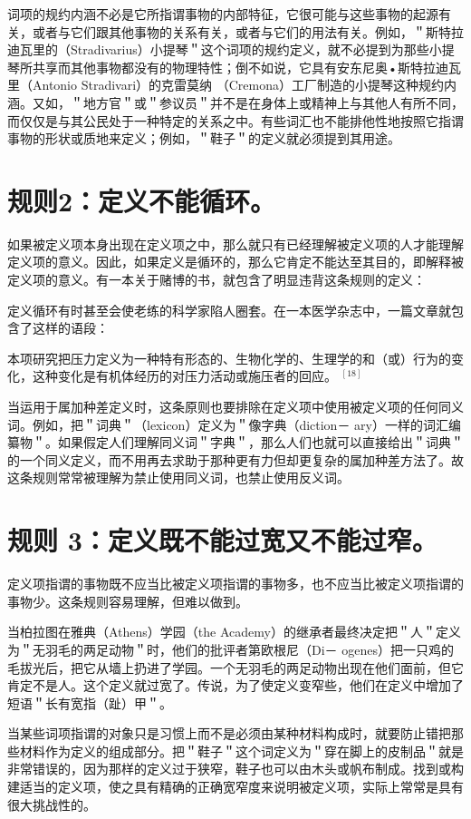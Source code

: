 词项的规约内涵不必是它所指谓事物的内部特征，它很可能与这些事物的起源有关，或者与它们跟其他事物的关系有关，或者与它们的用法有关。例如，＂斯特拉迪瓦里的（Stradivarius）小提琴＂这个词项的规约定义，就不必提到为那些小提琴所共享而其他事物都没有的物理特性；倒不如说，它具有安东尼奥•斯特拉迪瓦里（Antonio Stradivari）的克雷莫纳 （Cremona）工厂制造的小提琴这种规约内涵。又如，＂地方官＂或＂参议员＂并不是在身体上或精神上与其他人有所不同，而仅仅是与其公民处于一种特定的关系之中。有些词汇也不能排他性地按照它指谓事物的形状或质地来定义；例如，＂鞋子＂的定义就必须提到其用途。

\section*{规则2：定义不能循环。}
如果被定义项本身出现在定义项之中，那么就只有已经理解被定义项的人才能理解定义项的意义。因此，如果定义是循环的，那么它肯定不能达至其目的，即解释被定义项的意义。有一本关于赌博的书，就包含了明显违背这条规则的定义：

定义循环有时甚至会使老练的科学家陷人圈套。在一本医学杂志中，一篇文章就包含了这样的语段：

本项研究把压力定义为一种特有形态的、生物化学的、生理学的和（或）行为的变化，这种变化是有机体经历的对压力活动或施压者的回应。 ${ }^{[18]}$

当运用于属加种差定义时，这条原则也要排除在定义项中使用被定义项的任何同义词。例如，把＂词典＂（lexicon）定义为＂像字典（diction－ ary）一样的词汇编纂物＂。如果假定人们理解同义词＂字典＂，那么人们也就可以直接给出＂词典＂的一个同义定义，而不用再去求助于那种更有力但却更复杂的属加种差方法了。故这条规则常常被理解为禁止使用同义词，也禁止使用反义词。

\section*{规则 3：定义既不能过宽又不能过窄。}
定义项指谓的事物既不应当比被定义项指谓的事物多，也不应当比被定义项指谓的事物少。这条规则容易理解，但难以做到。

当柏拉图在雅典（Athens）学园（the Academy）的继承者最终决定把＂人＂定义为＂无羽毛的两足动物＂时，他们的批评者第欧根尼（Di－ ogenes）把一只鸡的毛拔光后，把它从墙上扔进了学园。一个无羽毛的两足动物出现在他们面前，但它肯定不是人。这个定义就过宽了。传说，为了使定义变窄些，他们在定义中增加了短语＂长有宽指（趾）甲＂。

当某些词项指谓的对象只是习惯上而不是必须由某种材料构成时，就要防止错把那些材料作为定义的组成部分。把＂鞋子＂这个词定义为＂穿在脚上的皮制品＂就是非常错误的，因为那样的定义过于狭窄，鞋子也可以由木头或帆布制成。找到或构建适当的定义项，使之具有精确的正确宽窄度来说明被定义项，实际上常常是具有很大挑战性的。

